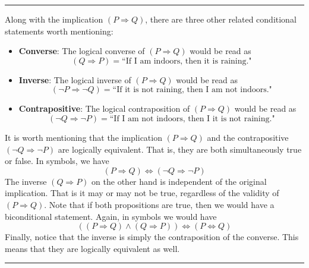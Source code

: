 \documentclass[12pt]{article}
\renewcommand{\_}[1]{\underline{ #1 }}
\theoremstyle{definition}
\numberwithin{equation}{subsection}
\begin{document}
\bigskip

\hrule

\bigskip


Along with the implication $(P \Longrightarrow Q)$, there are three other related conditional statements worth mentioning:

\begin{itemize}

    \item \textbf{Converse}: The logical converse of $(P \Longrightarrow Q)$ would be read as
    \[
        (Q \Longrightarrow P) = \text{``If I am indoors, then it is raining."}
    \]
    
    \item \textbf{Inverse}: The logical inverse of $(P \Longrightarrow Q)$ would be read as
    \[
        (\neg P \Longrightarrow \neg Q) = \text{``If it is not raining, then I am not indoors."}
    \]
    
    \item \textbf{Contrapositive}: The logical contraposition of $(P \Longrightarrow Q)$ would be read as
    \[
        (\neg Q \Longrightarrow \neg P) = \text{``If I am not indoors, then I it is not raining."}
    \]
    
\end{itemize}
It is worth mentioning that the implication $(P \Longrightarrow Q)$ and the contrapositive $(\neg Q \Longrightarrow \neg P)$ are logically equivalent. That is, they are both simultaneously true or false. In symbols, we have
\[
    (P \Longrightarrow Q) \Longleftrightarrow (\neg Q \Longrightarrow \neg P)
\]
The inverse $(Q \Longrightarrow P)$ on the other hand is independent of the original implication. That is it may or may not be true, regardless of the validity of $(P \Longrightarrow Q)$. Note that if both propositions are true, then we would have a biconditional statement. Again, in symbols we would have
\[
    ((P \Longrightarrow Q) \land (Q \Longrightarrow P)) \Longleftrightarrow (P \Longleftrightarrow Q)
\]
Finally, notice that the inverse is simply the contraposition of the converse. This means that they are logically equivalent as well.\\

\hrule
\end{document}
